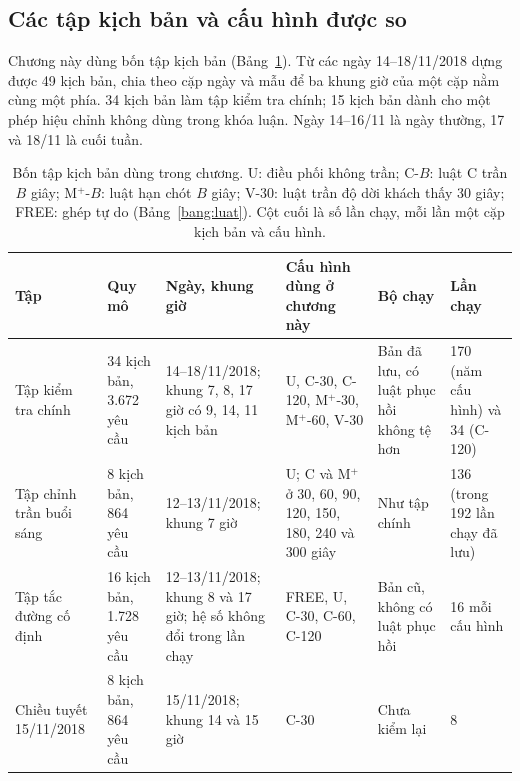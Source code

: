 \subsection{Các tập kịch bản và cấu hình được so}
\label{muc:c4-taptu}

Chương này dùng bốn tập kịch bản (Bảng~\ref{bang:c4-taptu}). Từ các ngày 14--18/11/2018 dựng được 49 kịch bản, chia
theo cặp ngày và mẫu để ba khung giờ của một cặp nằm cùng một phía. 34 kịch bản làm tập kiểm tra chính; 15 kịch bản
dành cho một phép hiệu chỉnh không dùng trong khóa luận. Ngày 14--16/11 là ngày thường, 17 và 18/11 là cuối tuần.

\begin{table}[htbp]
\centering
\caption{Bốn tập kịch bản dùng trong chương. U: điều phối không trần; C-$B$: luật C trần $B$ giây;
M$^{+}$-$B$: luật hạn chót $B$ giây; V-30: luật trần độ dời khách thấy 30 giây; FREE: ghép tự do
(Bảng~\ref{bang:luat}). Cột cuối là số lần chạy, mỗi lần một cặp kịch bản và cấu hình.}
\label{bang:c4-taptu}
\footnotesize
\setlength{\tabcolsep}{3pt}
\begin{tabular}{@{}p{2.5cm}p{1.9cm}p{3.1cm}p{3.0cm}p{2.6cm}p{1.9cm}@{}}
\toprule
\textbf{Tập} & \textbf{Quy mô} & \textbf{Ngày, khung giờ} & \textbf{Cấu hình dùng ở chương này} &
\textbf{Bộ chạy} & \textbf{Lần chạy}\\
\midrule
Tập kiểm tra chính & 34 kịch bản, 3.672 yêu cầu & 14--18/11/2018; khung 7, 8, 17 giờ có 9, 14, 11
kịch bản & U, C-30, C-120, M$^{+}$-30, M$^{+}$-60, V-30 & Bản đã lưu, có luật phục hồi không tệ hơn &
170 (năm cấu hình) và 34 (C-120)\\
Tập chỉnh trần buổi sáng & 8 kịch bản, 864 yêu cầu & 12--13/11/2018; khung 7 giờ & U; C và M$^{+}$ ở 30, 60,
90, 120, 150, 180, 240 và 300 giây & Như tập chính & 136 (trong 192 lần chạy đã lưu)\\
Tập tắc đường cố định & 16 kịch bản, 1.728 yêu cầu & 12--13/11/2018; khung 8 và 17 giờ; hệ số không
đổi trong lần chạy & FREE, U, C-30, C-60, C-120 & Bản cũ, không có luật phục hồi & 16 mỗi cấu hình\\
Chiều tuyết 15/11/2018 & 8 kịch bản, 864 yêu cầu & 15/11/2018; khung 14 và 15 giờ & C-30 &
Chưa kiểm lại & 8\\
\bottomrule
\end{tabular}
\end{table}

